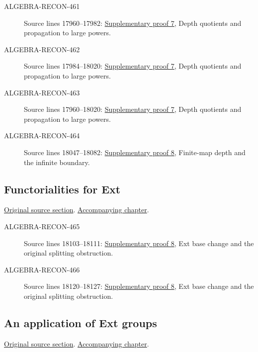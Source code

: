 \begin{description}
\item[ALGEBRA-RECON-461] Source lines 17960--17982: \hyperlink{algebra_blowup_ext_depth_notes_20260927}{Supplementary proof 7}, Depth quotients and propagation to large powers.
\item[ALGEBRA-RECON-462] Source lines 17984--18020: \hyperlink{algebra_blowup_ext_depth_notes_20260927}{Supplementary proof 7}, Depth quotients and propagation to large powers.
\item[ALGEBRA-RECON-463] Source lines 17960--18020: \hyperlink{algebra_blowup_ext_depth_notes_20260927}{Supplementary proof 7}, Depth quotients and propagation to large powers.
\item[ALGEBRA-RECON-464] Source lines 18047--18082: \hyperlink{algebra_depth_tor_projective_notes_20260927}{Supplementary proof 8}, Finite-map depth and the infinite boundary.
\end{description}

\subsection{Functorialities for Ext}
\hypertarget{algebra-source-section-functoriality-ext}{}
\noindent\href{https://github.com/stacks/stacks-project/blob/a04446e57ec1fbc252a871afcec7752fb2807b14/algebra.tex\#L18087}{Original source section}. \href{algebra.pdf\#nameddest=section-functoriality-ext}{Accompanying chapter}.

\begin{description}
\item[ALGEBRA-RECON-465] Source lines 18103--18111: \hyperlink{algebra_depth_tor_projective_notes_20260927}{Supplementary proof 8}, Ext base change and the original splitting obstruction.
\item[ALGEBRA-RECON-466] Source lines 18120--18127: \hyperlink{algebra_depth_tor_projective_notes_20260927}{Supplementary proof 8}, Ext base change and the original splitting obstruction.
\end{description}

\subsection{An application of Ext groups}
\hypertarget{algebra-source-section-ext-application}{}
\noindent\href{https://github.com/stacks/stacks-project/blob/a04446e57ec1fbc252a871afcec7752fb2807b14/algebra.tex\#L18135}{Original source section}. \href{algebra.pdf\#nameddest=section-ext-application}{Accompanying chapter}.

